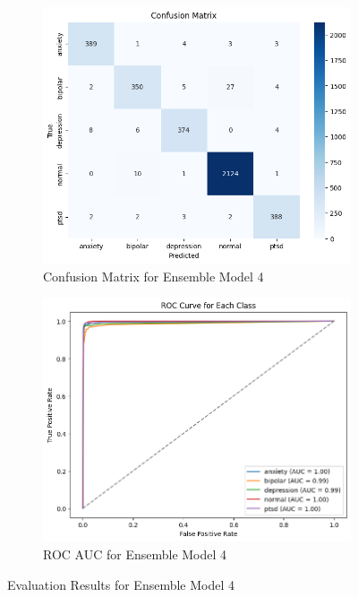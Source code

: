 \begin{figure}[h!]
    \centering
    \begin{subfigure}[b]{0.49\textwidth}
        \centering
        \includegraphics[width=\textwidth]{Images/BAG CM.png}
        \caption{Confusion Matrix for Ensemble Model 4}
        \label{bag cm}  %
    \end{subfigure}
    \hfill
    \begin{subfigure}[b]{0.49\textwidth}
        \centering
        \includegraphics[width=\textwidth]{Images/BAG ROC.png}
        \caption{ROC AUC for Ensemble Model 4}
        \label{bag roc}  %
    \end{subfigure}
    \caption{Evaluation Results for Ensemble Model 4}
    \label{fig:ensemble_model4_comparison}
\end{figure}

